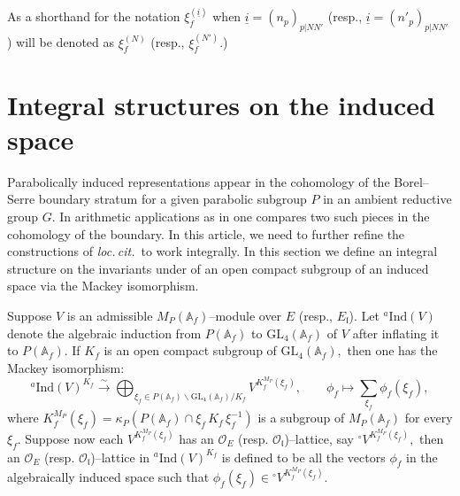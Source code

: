 \documentclass[11pt]{amsart}
\newcommand{\GL}{\mathrm{GL}}
\begin{document}
As a shorthand for the notation $\xi_f^{(\underline{i})}$ when $\underline{i} = (n_p)_{p|NN'}$ (resp., $\underline{i} = (n'_p)_{p|NN'}$) 
will be denoted as $\xi_f^{(N)}$ (resp., $\xi_f^{(N')}$.)



\medskip
\section{Integral structures on the induced space}
\label{sec:int-on-ind-space}
Parabolically induced representations appear in the cohomology of the Borel--Serre boundary stratum for a given parabolic subgroup 
$P$ in an ambient reductive group $G$. In arithmetic applications as in \cite{harder-raghuram} one compares two such pieces in the 
cohomology of the boundary. In this article, we need to further refine the constructions of {\it loc.\,cit.}\ to work integrally. 
In this section we define an integral structure on the invariants under of an open compact subgroup of an induced space 
via the Mackey isomorphism.

\smallskip

Suppose $V$ is an admissible $M_P(\mathbb{A}_f)$--module over $E$ (resp., $E_\mathfrak{l}$). 
Let ${^a}\text{Ind}(V)$ denote the algebraic induction from $P(\mathbb{A}_f)$ to $\GL_4(\mathbb{A}_f)$ of $V$ 
after inflating it to $P(\mathbb{A}_f).$ 
If $K_f$ is an open compact subgroup of $\GL_4(\mathbb{A}_f),$ then one has the Mackey isomorphism:
\begin{equation}
{^a}\text{Ind}(V)^{K_f} \xrightarrow{\sim} \bigoplus_{\xi_f \in P(\mathbb{A}_f) \backslash \GL_4(\mathbb{A}_f) / K_f} V^{K_f^{M_P}(\xi_f)},  
\quad \quad 
\phi_f \mapsto \sum_{\xi_f} \phi_f(\xi_f), \label{eqn: the-mackey-isomorphism}
\end{equation} 	where $K_f^{M_P}(\xi_f) = \kappa_P(P(\mathbb{A}_f) \cap \xi_f\, K_f \,\xi_f^{-1})$ is a subgroup of $M_P(\mathbb{A}_f)$ for every $\xi_f.$ 
Suppose now each $V^{K_f^{M_P}(\xi_f)}$ has an $\mathcal{O}_E$ (resp. $\mathcal{O}_\mathfrak{l}$)--lattice, 
say ${^\circ}V^{K_f^{M_P}(\xi_f)},$ then an $\mathcal{O}_E$ (resp. $\mathcal{O}_\mathfrak{l}$)--lattice in ${^a}\text{Ind}(V)^{K_f}$ 
is defined to be all the vectors $\phi_f$ in the algebraically induced space  such that $\phi_f(\xi_f) \in {^\circ}V^{K_f^{M_P}(\xi_f)}.$

\smallskip
\end{document}
